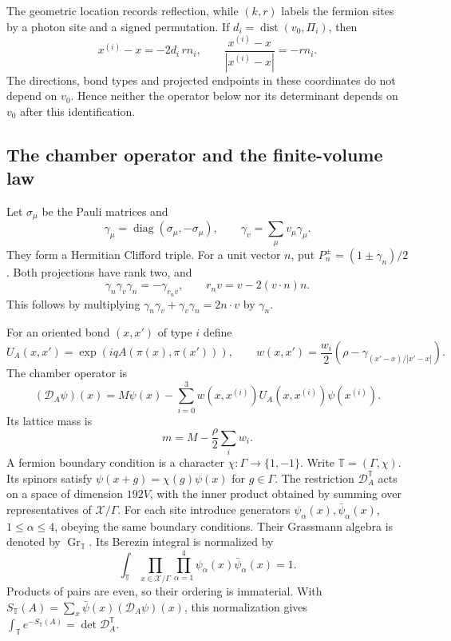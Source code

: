 \documentclass[11pt,letterpaper,reqno]{amsart}
\DeclareMathOperator{\diag}{diag}
\begin{document}
The geometric location records reflection, while $(k,r)$ labels the
fermion sites by a photon site and a signed permutation. If
$d_i=\operatorname{dist}(v_0,\Pi_i)$, then
\[
 x^{(i)}-x=-2d_i\,rn_i,
 \qquad \frac{x^{(i)}-x}{|x^{(i)}-x|}=-rn_i.
\]
The directions, bond types and projected endpoints in these
coordinates do not depend on $v_0$. Hence neither the operator below
nor its determinant depends on $v_0$ after this identification.
\subsection{The chamber operator and the finite-volume law}
\label{subsec:reg-law}

Let $\sigma_\mu$ be the Pauli matrices and
\[
 \gamma_\mu=\diag(\sigma_\mu,-\sigma_\mu),\qquad
 \gamma_v=\sum_\mu v_\mu\gamma_\mu.
\]
They form a Hermitian Clifford triple. For a unit vector $n$, put
$P_n^\pm=(1\pm\gamma_n)/2$. Both projections have rank two, and
\begin{equation}\label{eq:reg-clifford-reflection}
 \gamma_n\gamma_v\gamma_n=-\gamma_{r_nv},\qquad
 r_nv=v-2(v\cdot n)n.
\end{equation}
This follows by multiplying
$\gamma_n\gamma_v+\gamma_v\gamma_n=2n\cdot v$ by $\gamma_n$.

For an oriented bond $(x,x')$ of type $i$ define
\begin{equation}\label{eq:reg-hop}
 U_A(x,x')=\exp(iqA(\pi(x),\pi(x'))),\qquad
 w(x,x')=\frac{w_i}{2}\left(\rho-\gamma_{(x'-x)/|x'-x|}\right).
\end{equation}
The chamber operator is
\begin{equation}\label{eq:reg-dirac}
 (\mathcal D_A\psi)(x)=M\psi(x)-\sum_{i=0}^3
                   w(x,x^{(i)})U_A(x,x^{(i)})\psi(x^{(i)}).
\end{equation}
Its lattice mass is
\begin{equation}\label{eq:reg-lattice-mass}
 m=M-\frac\rho2\sum_iw_i.
\end{equation}
A fermion boundary condition is a character
$\chi:\Gamma\to\{1,-1\}$. Write $\mathbb T=(\Gamma,\chi)$.
Its spinors satisfy $\psi(x+g)=\chi(g)\psi(x)$ for $g\in\Gamma$.
The restriction $\mathcal D_A^{\mathbb T}$ acts on a space of dimension $192V$,
with the inner product obtained by summing over representatives of
$\mathcal X/\Gamma$. For each site introduce generators
$\psi_\alpha(x),\bar\psi_\alpha(x)$, $1\le\alpha\le4$, obeying the same
boundary conditions. Their Grassmann algebra is denoted by
$\operatorname{Gr}_{\mathbb T}$. Its Berezin integral is normalized by
\begin{equation}\label{eq:reg-berezin}
 \int_{\mathbb T}\prod_{x\in\mathcal X/\Gamma}
                  \prod_{\alpha=1}^4\psi_\alpha(x)\bar\psi_\alpha(x)=1.
\end{equation}
Products of pairs are even, so their ordering is immaterial. With
$S_{\mathbb T}(A)=\sum_x\bar\psi(x)(\mathcal D_A\psi)(x)$, this normalization
gives $\int_{\mathbb T}e^{-S_{\mathbb T}(A)}=\det \mathcal D_A^{\mathbb T}$.
\end{document}

